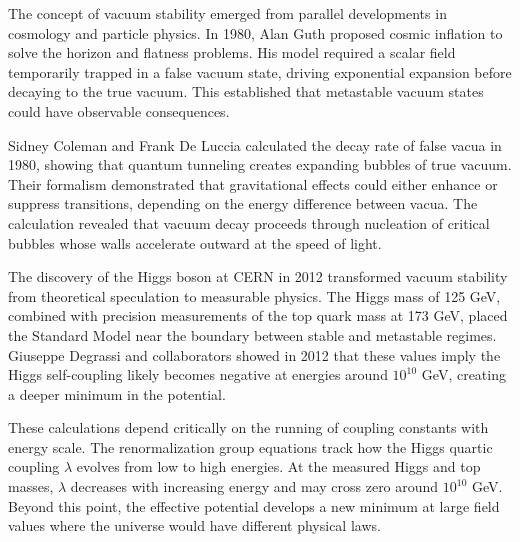 
\begin{historical}
    The concept of vacuum stability emerged from parallel developments in cosmology and particle physics. In 1980, Alan Guth proposed cosmic inflation to solve the horizon and flatness problems. His model required a scalar field temporarily trapped in a false vacuum state, driving exponential expansion before decaying to the true vacuum. This established that metastable vacuum states could have observable consequences.

Sidney Coleman and Frank De Luccia calculated the decay rate of false vacua in 1980, showing that quantum tunneling creates expanding bubbles of true vacuum. Their formalism demonstrated that gravitational effects could either enhance or suppress transitions, depending on the energy difference between vacua. The calculation revealed that vacuum decay proceeds through nucleation of critical bubbles whose walls accelerate outward at the speed of light.

The discovery of the Higgs boson at CERN in 2012 transformed vacuum stability from theoretical speculation to measurable physics. The Higgs mass of 125 GeV, combined with precision measurements of the top quark mass at 173 GeV, placed the Standard Model near the boundary between stable and metastable regimes. Giuseppe Degrassi and collaborators showed in 2012 that these values imply the Higgs self-coupling likely becomes negative at energies around $10^{10}$ GeV, creating a deeper minimum in the potential.

These calculations depend critically on the running of coupling constants with energy scale. The renormalization group equations track how the Higgs quartic coupling $\lambda$ evolves from low to high energies. At the measured Higgs and top masses, $\lambda$ decreases with increasing energy and may cross zero around $10^{10}$ GeV. Beyond this point, the effective potential develops a new minimum at large field values where the universe would have different physical laws.
\end{historical}